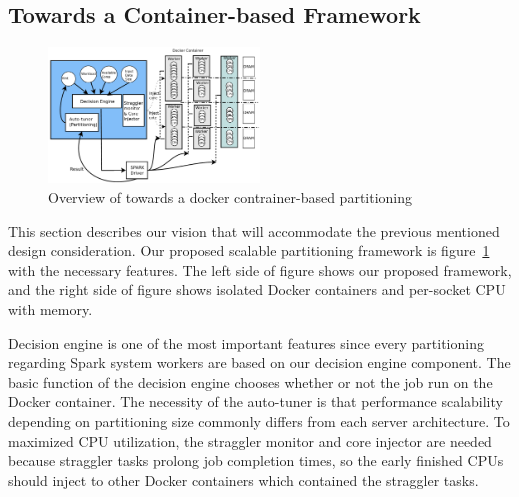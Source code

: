 \fi


\subsection{Towards a Container-based Framework}

\begin{figure}[h]
  \begin{center}
     \includegraphics[width=0.5\textwidth]{fig/jaildocker}
  \end{center}
  \caption{Overview of towards a docker contrainer-based
  partitioning}
  \label{fig:basic}
\end{figure}

This section describes our vision that will accommodate the previous
mentioned design consideration.
Our proposed scalable partitioning framework is figure~\ref{fig:basic} with the
necessary features.
The left side of figure shows our proposed framework, and the right side of
figure shows isolated Docker containers and per-socket CPU with memory.

Decision engine is one of the most important features
since every partitioning regarding Spark system workers are based
on our decision engine component.
The basic function of the decision engine chooses whether or not the job
run on the Docker container.
The necessity of the auto-tuner is that performance scalability depending on partitioning
size commonly differs from each server architecture.
To maximized CPU utilization, the straggler monitor and core injector are needed
because straggler tasks prolong job completion times, so the
early finished CPUs should inject to other Docker containers which
contained the straggler tasks.

